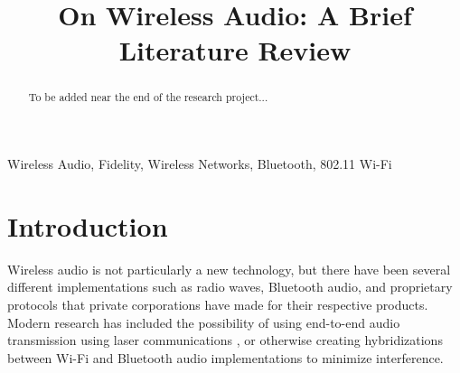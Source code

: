 \documentclass[conference]{IEEEtran}
\begin{document}
\title{On Wireless Audio: A Brief Literature Review}

\author{
    \and
    \and
}

\maketitle


\begin{abstract}
    To be added near the end of the research project...
\end{abstract}

\begin{IEEEkeywords}
    Wireless Audio, Fidelity, Wireless Networks, Bluetooth, 802.11 Wi-Fi
\end{IEEEkeywords}

\section*{Introduction}
Wireless audio is not particularly a new technology, but there have been several different
implementations such as radio waves, Bluetooth audio, and proprietary protocols that
private corporations have made for their respective products.\cite{bhalla_unraveling_2021}
Modern research has included the possibility of using end-to-end audio transmission using 
laser communications \cite{anthony_approach_2021}, or otherwise creating hybridizations 
between Wi-Fi and Bluetooth audio implementations to minimize interference.
\cite{forenbacher_throughput_2021}
\end{document}
